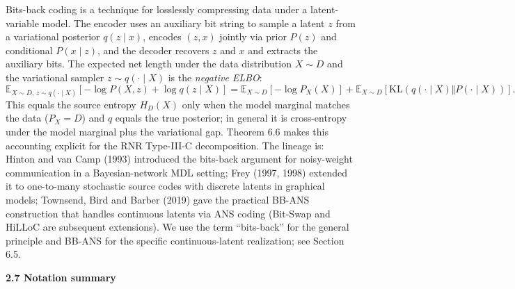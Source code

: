 \documentclass[
]{article}
\begin{document}
Bits-back coding is a technique for losslessly compressing data under
a latent-variable model. The encoder uses an auxiliary bit string to
sample a latent $z$ from a variational posterior $q(z \mid x)$,
encodes $(z, x)$ jointly via prior $P(z)$ and conditional
$P(x \mid z)$, and the decoder recovers $z$ and $x$ and extracts the
auxiliary bits. The expected net length under the data distribution
$X \sim D$ and the variational sampler $z \sim q(\cdot \mid X)$ is
the \emph{negative ELBO}:
\[
\mathbb{E}_{X \sim D,\, z \sim q(\cdot \mid X)} \!\left[-\log P(X, z) + \log q(z \mid X)\right]
= \mathbb{E}_{X \sim D}\!\left[-\log P_X(X)\right]
+ \mathbb{E}_{X \sim D}\!\left[\mathrm{KL}(q(\cdot \mid X) \Vert P(\cdot \mid X))\right].
\]
This equals the source entropy $H_D(X)$ only when the model marginal
matches the data ($P_X = D$) and $q$ equals the true posterior; in
general it is cross-entropy under the model marginal plus the
variational gap. Theorem 6.6 makes this accounting explicit for the
RNR Type-III-C decomposition. The lineage is: Hinton and van Camp
(1993) introduced the bits-back argument for noisy-weight
communication in a Bayesian-network MDL setting; Frey (1997, 1998)
extended it to one-to-many stochastic source codes with discrete
latents in graphical models; Townsend, Bird and Barber (2019) gave
the practical BB-ANS construction that handles continuous latents via
ANS coding (Bit-Swap and HiLLoC are subsequent extensions). We use
the term ``bits-back'' for the general principle and BB-ANS for the
specific continuous-latent realization; see Section 6.5.

\textbf{2.7 Notation summary}
\end{document}
